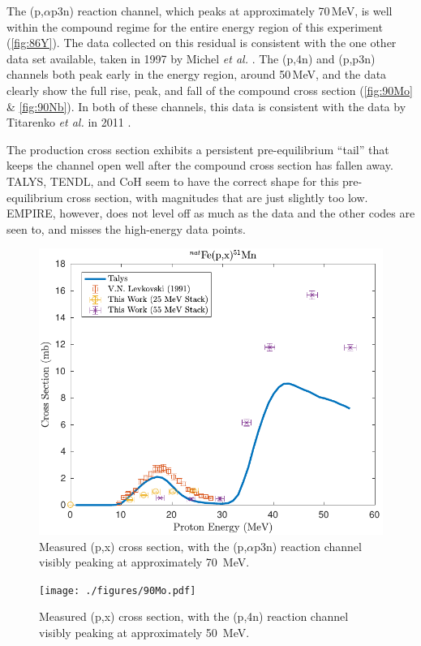 The (p,$\alpha$p3n) reaction channel, which peaks at approximately \mbox{70\,MeV}, is well within the compound regime for the entire energy region of this experiment (\autoref{fig:86Y}).
The data collected on this residual is consistent with the one other data set available, taken in 1997 by Michel \emph{et al.} \cite{MICHEL1997153}. 
The (p,4n) and (p,p3n) channels both peak early in the energy region, around 50\,MeV, and the data clearly show the full rise, peak, and fall of the compound cross section (\autoref{fig:90Mo} \& \ref{fig:90Nb}). 
In both of these channels, this data  is consistent with the data by Titarenko \emph{et al.} in 2011 \cite{Titarenko2011}.

The  production cross section exhibits a persistent pre-equilibrium \enquote{tail} that keeps the channel open  well after the compound cross section has fallen away. 
TALYS, TENDL, and CoH seem to have the correct shape for this pre-equilibrium cross section, with magnitudes that are just slightly too low.
EMPIRE, however, does not level off  as much as the data and the other codes are seen to, and misses the high-energy data points.

\begin{figure}
 \centering
 \includegraphics[width=0.5\linewidth]{./figures/51Mn_px.pdf}
 \caption{Measured (p,x) cross section, with the (p,$\alpha$p3n) reaction channel visibly peaking at approximately \mbox{70 MeV}.}
 \label{fig:51Mn}
\end{figure}




\begin{figure}
 \centering
 \texttt{[image: ./figures/90Mo.pdf]}
 \caption{Measured (p,x) cross section, with the (p,4n) reaction channel visibly peaking at approximately \mbox{50 MeV}.}
 \label{fig:temp_90Mo}
\end{figure}


